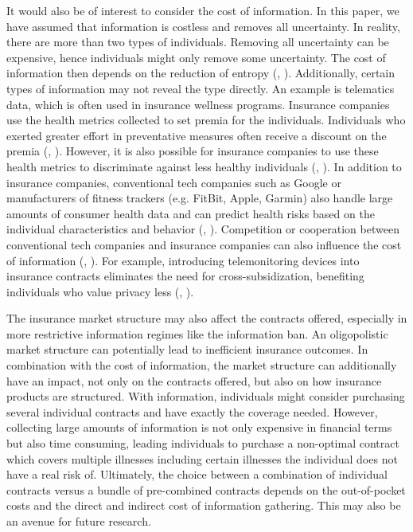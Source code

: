 \documentclass[nonatbib,preprint,12pt]{elsarticle}
\theoremstyle{plain}
\theoremstyle{definition}
\theoremstyle{plain}
\theoremstyle{TheoremNum}
\theoremstyle{CorollaryNum}
\theoremstyle{PropositionNum}
\theoremstyle{TheoremNum}
\begin{document}
It would also be of interest to consider the cost of information. In this paper, we have assumed that information is costless and removes all uncertainty. In reality, there are more than two types of individuals. Removing all uncertainty can be expensive, hence individuals might only remove some uncertainty. The cost of information then depends on the reduction of entropy (\citeauthor{shannon1948mathematical}, 
\citeyear{shannon1948mathematical}). Additionally, certain types of information may not reveal the type directly. An example is telematics data, which is often used in insurance wellness programs. Insurance companies use the health metrics collected to set premia for the individuals. Individuals who exerted greater effort in preventative measures often receive a discount on the premia (\citeauthor{sharpe2019telematics}, \citeyear{sharpe2019telematics}). However, it is also possible for insurance companies to use these health metrics to discriminate against less healthy individuals (\citeauthor{prince2020insurancewellness}, \citeyear{prince2020insurancewellness}). In addition to insurance companies, conventional tech companies such as Google or manufacturers of fitness trackers (e.g. FitBit, Apple, Garmin) also handle large amounts of consumer health data and can predict health risks based on the individual characteristics and behavior (\citeauthor{bourreau2020google}, \citeyear{bourreau2020google}). Competition or cooperation between conventional tech companies and insurance companies can also influence the cost of information (\citeauthor{pasquale2013protecting}, \citeyear{pasquale2013protecting}). For example, introducing telemonitoring devices into insurance contracts eliminates the need for cross-subsidization, benefiting individuals who value privacy less (\citeauthor{gemmo2019privacy}, \citeyear{gemmo2019privacy}).

The insurance market structure may also affect the contracts offered, especially in more restrictive information regimes like the information ban. An oligopolistic market structure can potentially lead to inefficient insurance outcomes. In combination with the cost of information, the market structure can additionally have an impact, not only on the contracts offered, but also on how insurance products are structured. With information, individuals might consider purchasing several individual contracts and have exactly the coverage needed. However, collecting large amounts of information is not only expensive in financial terms but also time consuming, leading individuals to purchase a non-optimal contract which covers multiple illnesses including certain illnesses the individual does not have a real risk of. Ultimately, the choice between a combination of individual contracts versus a bundle of pre-combined contracts depends on the out-of-pocket costs and the direct and indirect cost of information gathering. This may also be an avenue for future research.
\end{document}
